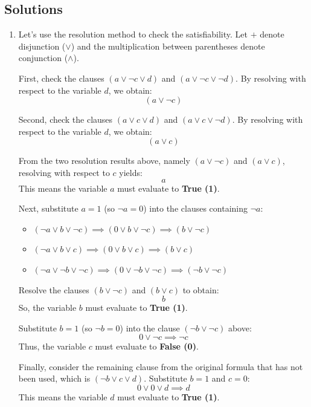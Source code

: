 \documentclass[a4paper]{article}
\theoremstyle{definition}
\begin{document}
\subsection*{Solutions}

\begin{enumerate}
  \item Let's use the resolution method to check the satisfiability. Let $+$ denote disjunction ($\lor$) and the multiplication between parentheses denote conjunction ($\land$).

        First, check the clauses $(a \lor \neg c \lor d)$ and $(a \lor \neg c \lor \neg d)$. By resolving with respect to the variable $d$, we obtain:
        \[ (a \lor \neg c) \]

        Second, check the clauses $(a \lor c \lor d)$ and $(a \lor c \lor \neg d)$. By resolving with respect to the variable $d$, we obtain:
        \[ (a \lor c) \]

        From the two resolution results above, namely $(a \lor \neg c)$ and $(a \lor c)$, resolving with respect to $c$ yields:
        \[ a \]
        This means the variable $a$ must evaluate to \textbf{True (1)}.

        Next, substitute $a = 1$ (so $\neg a = 0$) into the clauses containing $\neg a$:
        \begin{itemize}
          \item $(\neg a \lor b \lor \neg c) \implies (0 \lor b \lor \neg c) \implies (b \lor \neg c)$
          \item $(\neg a \lor b \lor c) \implies (0 \lor b \lor c) \implies (b \lor c)$
          \item $(\neg a \lor \neg b \lor \neg c) \implies (0 \lor \neg b \lor \neg c) \implies (\neg b \lor \neg c)$
        \end{itemize}

        Resolve the clauses $(b \lor \neg c)$ and $(b \lor c)$ to obtain:
        \[ b \]
        So, the variable $b$ must evaluate to \textbf{True (1)}.

        Substitute $b = 1$ (so $\neg b = 0$) into the clause $(\neg b \lor \neg c)$ above:
        \[ 0 \lor \neg c \implies \neg c \]
        Thus, the variable $c$ must evaluate to \textbf{False (0)}.

        Finally, consider the remaining clause from the original formula that has not been used, which is $(\neg b \lor c \lor d)$. Substitute $b = 1$ and $c = 0$:
        \[ 0 \lor 0 \lor d \implies d \]
        This means the variable $d$ must evaluate to \textbf{True (1)}.


\end{enumerate}
\end{document}
